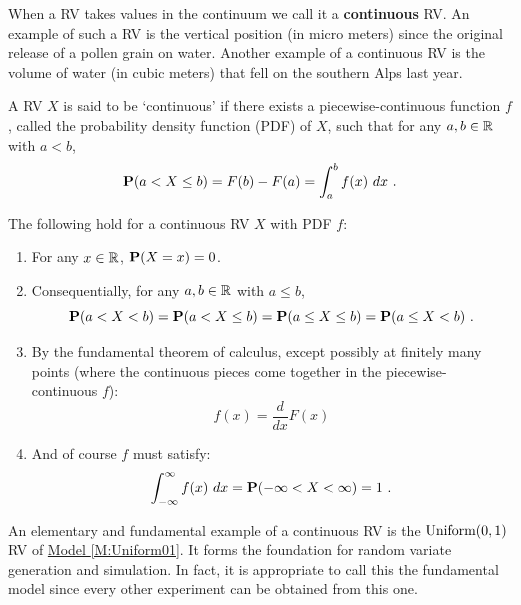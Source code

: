 When a RV takes values in the continuum we call it a {\bf continuous} RV.  An example of such a RV is the vertical position (in micro meters) since the original release of a pollen grain on water.  Another example of a continuous RV is the volume of water (in cubic meters) that fell on the southern Alps last year.  
\begin{definition}
A RV $X$ is said to be `continuous' if there exists a piecewise-continuous function $f$, called the probability density function (PDF) of $X$, such that for any $a, b \in \mathbb{R}$ with $a < b$,
\[
\mathbf{P}(a < X \leq b) = F(b)-F(a) = \int_a^b f(x) \ dx \ .
\]
\end{definition}
The following hold for a continuous RV $X$ with PDF $f$:
\begin{enumerate}
\item For any $x \in \mathbb{R}$, $\mathbf{P}(X=x)=0$.
\item Consequentially, for any $a,b \in \mathbb{R}$ with $a \leq b$,
\[
\mathbf{P}(a < X < b ) = \mathbf{P}(a < X \leq b) = \mathbf{P}(a \leq X \leq b) = \mathbf{P}(a \leq X < b) \ .
\]
\item By the fundamental theorem of calculus, except possibly at finitely many points (where the continuous pieces come together in the piecewise-continuous $f$):
\[
f(x) = \frac{d}{dx} F(x)
\]
\item And of course $f$ must satisfy:
\[
\int_{-\infty}^{\infty} f(x) \ dx = \mathbf{P}(-\infty < X < \infty) = 1 \ .
\] 
\end{enumerate}

An elementary and fundamental example of a continuous RV is the $\mbox{{\rm Uniform}}(0,1)$ RV of \hyperref[M:Uniform01]{Model \ref*{M:Uniform01}}.  It forms the foundation for random variate generation and simulation.  In fact, it is appropriate to call this the fundamental model since every other experiment can be obtained from this one.


